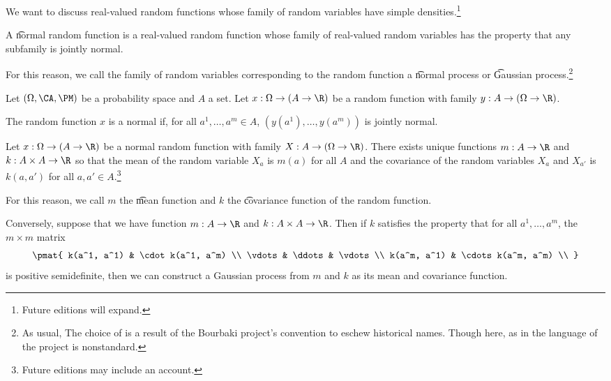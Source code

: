 

We want to discuss real-valued random functions whose family of random variables have simple densities.\footnote{Future editions will expand.}


A \t{normal random function} is a real-valued random function whose family of real-valued random variables has the property that any subfamily is jointly normal.

For this reason, we call the family of random variables corresponding to the random function a \t{normal process} or \t{Gaussian process}.\footnote{As usual, The choice of  is a result of the Bourbaki project's convention to eschew historical names. Though here, as in  the language of the project is nonstandard.}


Let $(\Omega, \CA, \PM)$ be a probability space and $A$ a set.
Let $x: \Omega \to (A \to \R)$ be a random function with family $y: A \to (\Omega \to \R)$.

The random function $x$ is a normal if, for all $a^1, \dots, a^m \in A$, $(y(a^1), \dots, y(a^m))$ is jointly normal.


\begin{proposition}
  Let $x: \Omega \to (A \to \R)$ be a normal random function with family $X: A \to (\Omega \to \R)$.
  There exists unique functions $m: A \to \R$ and $k: A \times A \to \R$ so that the mean of the random variable $X_a$ is $m(a)$ for all $A$ and the covariance of the random variables $X_a$ and $X_{a'}$ is $k(a, a')$ for all $a, a' \in A$.\footnote{Future editions may include an account.}
\end{proposition}
For this reason, we call $m$ the \t{mean function} and $k$ the \t{covariance function} of the random function.

Conversely, suppose that we have function $m: A \to \R$ and $k: A \times A \to \R$.
Then if $k$ satisfies the property that for all $a^1, \dots, a^m$, the $m \times m$ matrix
\[
  \pmat{
    k(a^1, a^1) & \cdot k(a^1, a^m) \\
    \vdots & \ddots & \vdots \\
    k(a^m, a^1) & \cdots k(a^m, a^m) \\
  }
\]
is positive semidefinite, then we can construct a Gaussian process from $m$ and $k$ as its mean and covariance function.

